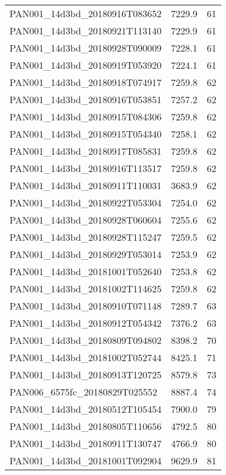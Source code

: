 \begin{tabular}{lrr}
PAN001\_14d3bd\_20180916T083652 &     7229.9 &       61 \\
PAN001\_14d3bd\_20180921T113140 &     7229.9 &       61 \\
PAN001\_14d3bd\_20180928T090009 &     7228.1 &       61 \\
PAN001\_14d3bd\_20180919T053920 &     7224.1 &       61 \\
PAN001\_14d3bd\_20180918T074917 &     7259.8 &       62 \\
PAN001\_14d3bd\_20180916T053851 &     7257.2 &       62 \\
PAN001\_14d3bd\_20180915T084306 &     7259.8 &       62 \\
PAN001\_14d3bd\_20180915T054340 &     7258.1 &       62 \\
PAN001\_14d3bd\_20180917T085831 &     7259.8 &       62 \\
PAN001\_14d3bd\_20180916T113517 &     7259.8 &       62 \\
PAN001\_14d3bd\_20180911T110031 &     3683.9 &       62 \\
PAN001\_14d3bd\_20180922T053304 &     7254.0 &       62 \\
PAN001\_14d3bd\_20180928T060604 &     7255.6 &       62 \\
PAN001\_14d3bd\_20180928T115247 &     7259.5 &       62 \\
PAN001\_14d3bd\_20180929T053014 &     7253.9 &       62 \\
PAN001\_14d3bd\_20181001T052640 &     7253.8 &       62 \\
PAN001\_14d3bd\_20181002T114625 &     7259.8 &       62 \\
PAN001\_14d3bd\_20180910T071148 &     7289.7 &       63 \\
PAN001\_14d3bd\_20180912T054342 &     7376.2 &       63 \\
PAN001\_14d3bd\_20180809T094802 &     8398.2 &       70 \\
PAN001\_14d3bd\_20181002T052744 &     8425.1 &       71 \\
PAN001\_14d3bd\_20180913T120725 &     8579.8 &       73 \\
PAN006\_6575fc\_20180829T025552 &     8887.4 &       74 \\
PAN001\_14d3bd\_20180512T105454 &     7900.0 &       79 \\
PAN001\_14d3bd\_20180805T110656 &     4792.5 &       80 \\
PAN001\_14d3bd\_20180911T130747 &     4766.9 &       80 \\
PAN001\_14d3bd\_20181001T092904 &     9629.9 &       81 \\

\end{tabular}
